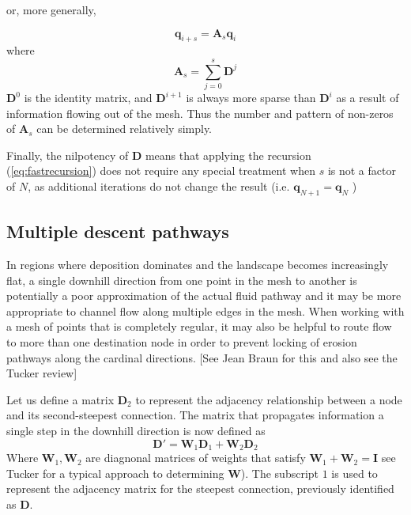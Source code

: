 \documentclass[draft,jgrga]{agu_template/AGUTeX}
\begin{document}
or, more generally,

\begin{equation}
    \bm{q}_{i+s} = \bm{A}_s \bm{q}_i
    \label{eq:fastrecursion}
\end{equation}
where
\begin{equation}
    \bm{A}_s = \sum_{j=0}^{s} \bm{D}^j
\end{equation}
$\bm{D}^0$ is the identity matrix, and $\bm{D}^{i+1}$ is always more sparse than $\bm{D}^i$ as a result of information flowing out of the mesh. Thus the number and pattern of non-zeros of $\bm{A}_s$ can be determined relatively simply.

Finally, the nilpotency of $\bm{D}$ means that applying the recursion (\ref{eq:fastrecursion}) does not require any special treatment when $s$ is not a factor of $N$, as additional iterations do not change the result (i.e. $\bm{q}_{N+1} = \bm{q}_{N}$ )


\subsection{Multiple descent pathways}

In regions where deposition dominates and the landscape becomes increasingly flat, a single downhill direction from one point in the mesh to another is potentially a poor approximation of the actual fluid pathway and it may be more appropriate to channel flow along multiple edges in the mesh. When working with a mesh of points that is completely regular, it may also be helpful to route flow to more than one destination node in order to prevent locking of erosion pathways along the cardinal directions. [See Jean Braun for this and also see the Tucker review]

Let us define a matrix $\bm{D}_2$ to represent the adjacency relationship between a node and its second-steepest connection. The matrix that propagates information a single step in the downhill direction is now defined as
\begin{equation}
    \bm{D'} =  \bm{W}_1  \bm{D}_1 +
                  \bm{W}_2  \bm{D}_2
\end{equation}
Where $\bm{W}_{1}, \bm{W}_{2}$ are diagnonal matrices of weights that satisfy $ \bm{W}_1 +  \bm{W}_2 =  \bm{I}$ see Tucker for a typical approach to determining $\bm{W}$). The subscript $1$ is used to represent the adjacency matrix for the steepest connection, previously identified as $\bm{D}$.
\end{document}
